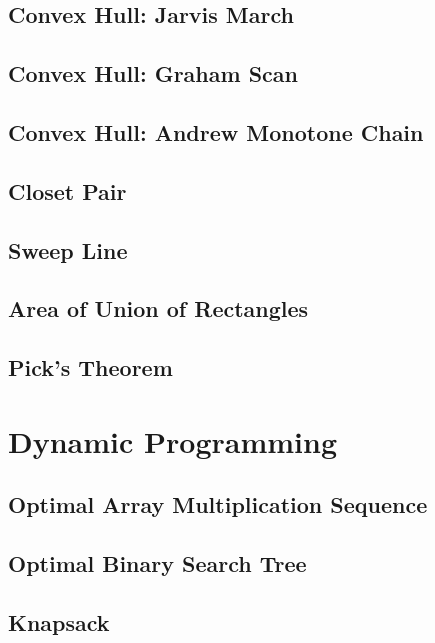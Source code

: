 \documentclass{article}
\begin{document}
    \subsection{Convex Hull: Jarvis March}
    \subsection{Convex Hull: Graham Scan}
        
    \subsection{Convex Hull: Andrew Monotone Chain}
        
    \subsection{Closet Pair}
        
    \subsection{Sweep Line}
        
    \subsection{Area of Union of Rectangles}
        
    \subsection{Pick's Theorem}

\section{Dynamic Programming}
    \subsection{Optimal Array Multiplication Sequence}
        
    \subsection{Optimal Binary Search Tree}
    \subsection{Knapsack}
\end{document}
